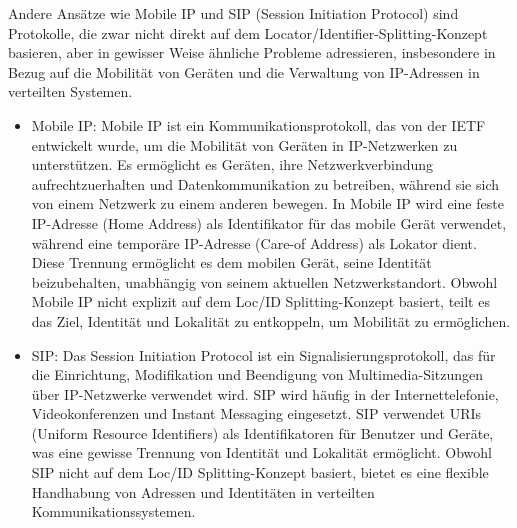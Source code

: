 Andere Ansätze wie Mobile IP und SIP (Session Initiation Protocol) sind Protokolle, die zwar nicht direkt auf dem Locator/Identifier-Splitting-Konzept basieren, aber in gewisser Weise ähnliche Probleme adressieren, insbesondere in Bezug auf die Mobilität von Geräten und die Verwaltung von IP-Adressen in verteilten Systemen.
\begin{itemize}
\item Mobile IP: Mobile IP ist ein Kommunikationsprotokoll, das von der IETF entwickelt wurde, um die Mobilität von Geräten in IP-Netzwerken zu unterstützen. Es ermöglicht es Geräten, ihre Netzwerkverbindung aufrechtzuerhalten und Datenkommunikation zu betreiben, während sie sich von einem Netzwerk zu einem anderen bewegen. In Mobile IP wird eine feste IP-Adresse (Home Address) als Identifikator für das mobile Gerät verwendet, während eine temporäre IP-Adresse (Care-of Address) als Lokator dient. Diese Trennung ermöglicht es dem mobilen Gerät, seine Identität beizubehalten, unabhängig von seinem aktuellen Netzwerkstandort. Obwohl Mobile IP nicht explizit auf dem Loc/ID Splitting-Konzept basiert, teilt es das Ziel, Identität und Lokalität zu entkoppeln, um Mobilität zu ermöglichen. 

\item SIP: Das Session Initiation Protocol ist ein Signalisierungsprotokoll, das für die Einrichtung, Modifikation und Beendigung von Multimedia-Sitzungen über IP-Netzwerke verwendet wird. SIP wird häufig in der Internettelefonie, Videokonferenzen und Instant Messaging eingesetzt. SIP verwendet URIs (Uniform Resource Identifiers) als Identifikatoren für Benutzer und Geräte, was eine gewisse Trennung von Identität und Lokalität ermöglicht. Obwohl SIP nicht auf dem Loc/ID Splitting-Konzept basiert, bietet es eine flexible Handhabung von Adressen und Identitäten in verteilten Kommunikationssystemen.   
\end{itemize} 

